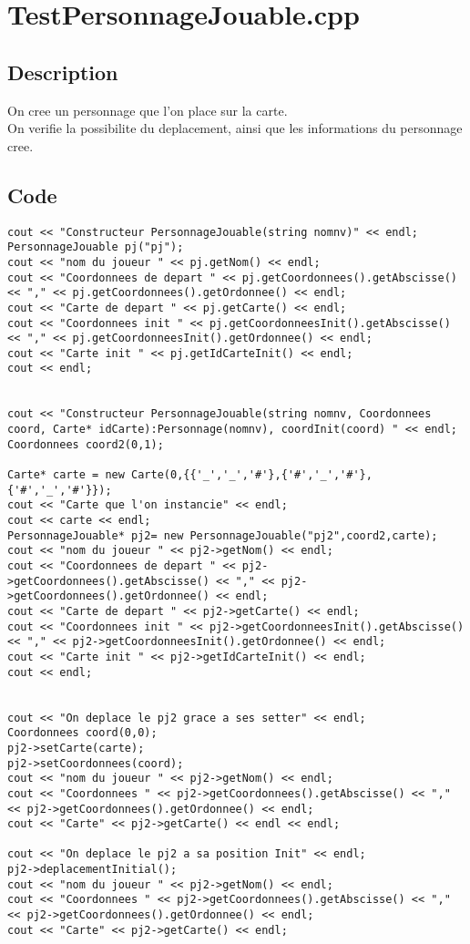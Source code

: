     \section{TestPersonnageJouable.cpp}
        \subsection{Description}
            On cree un personnage que l'on place sur la carte.\\
            On verifie la possibilite du deplacement, ainsi que les informations du personnage cree.
        \subsection{Code}
\begin{lstlisting}
cout << "Constructeur PersonnageJouable(string nomnv)" << endl;
PersonnageJouable pj("pj");
cout << "nom du joueur " << pj.getNom() << endl;
cout << "Coordonnees de depart " << pj.getCoordonnees().getAbscisse() << "," << pj.getCoordonnees().getOrdonnee() << endl;
cout << "Carte de depart " << pj.getCarte() << endl;
cout << "Coordonnees init " << pj.getCoordonneesInit().getAbscisse() << "," << pj.getCoordonneesInit().getOrdonnee() << endl;
cout << "Carte init " << pj.getIdCarteInit() << endl;
cout << endl;


cout << "Constructeur PersonnageJouable(string nomnv, Coordonnees coord, Carte* idCarte):Personnage(nomnv), coordInit(coord) " << endl;
Coordonnees coord2(0,1);

Carte* carte = new Carte(0,{{'_','_','#'},{'#','_','#'},{'#','_','#'}});
cout << "Carte que l'on instancie" << endl;
cout << carte << endl;
PersonnageJouable* pj2= new PersonnageJouable("pj2",coord2,carte);
cout << "nom du joueur " << pj2->getNom() << endl;
cout << "Coordonnees de depart " << pj2->getCoordonnees().getAbscisse() << "," << pj2->getCoordonnees().getOrdonnee() << endl;
cout << "Carte de depart " << pj2->getCarte() << endl;
cout << "Coordonnees init " << pj2->getCoordonneesInit().getAbscisse() << "," << pj2->getCoordonneesInit().getOrdonnee() << endl;
cout << "Carte init " << pj2->getIdCarteInit() << endl;
cout << endl;


cout << "On deplace le pj2 grace a ses setter" << endl;
Coordonnees coord(0,0);
pj2->setCarte(carte);
pj2->setCoordonnees(coord);
cout << "nom du joueur " << pj2->getNom() << endl;
cout << "Coordonnees " << pj2->getCoordonnees().getAbscisse() << "," << pj2->getCoordonnees().getOrdonnee() << endl;
cout << "Carte" << pj2->getCarte() << endl << endl;

cout << "On deplace le pj2 a sa position Init" << endl;
pj2->deplacementInitial();
cout << "nom du joueur " << pj2->getNom() << endl;
cout << "Coordonnees " << pj2->getCoordonnees().getAbscisse() << "," << pj2->getCoordonnees().getOrdonnee() << endl;
cout << "Carte" << pj2->getCarte() << endl;	
	\end{lstlisting}
